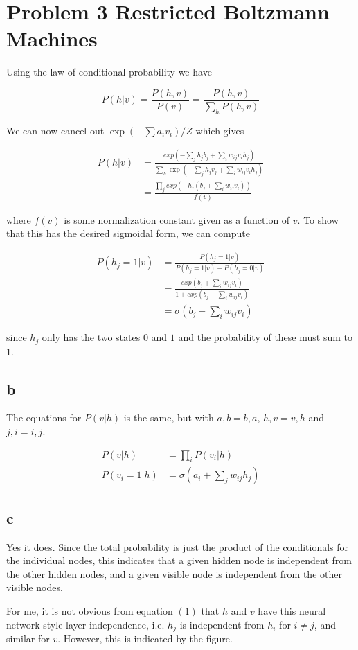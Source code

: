 \documentclass[10pt,a4paper]{article}
\begin{document}
\clearpage

\section*{Problem 3 Restricted Boltzmann Machines}

Using the law of conditional probability we have

\begin{equation}
P(h|v) = \frac{P(h,v)}{P(v)} = \frac{P(h,v)}{\sum_h P(h,v)}
\end{equation}

We can now cancel out $\exp(-\sum a_i v_i) / Z$ which gives

\begin{align}
P(h|v) &= \frac{exp(-\sum_j h_j b_j + \sum_i w_{ij} v_i h_j)}{\sum_h \exp(-\sum_j h_j v_j + \sum_i w_{ij} v_i h_j)} \\
&= \frac{\prod_j exp(-h_j(b_j + \sum_i w_{ij}v_i))}{f(v)}
\end{align}

where $f(v)$ is some normalization constant given as a function of $v$. To show that this has the desired sigmoidal form, we can compute

\begin{align}
P(h_j = 1 | v) &= \frac{P(h_j = 1 | v)}{P(h_j = 1 | v) + P(h_j = 0 | v)} \\
&= \frac{exp(b_j + \sum_i w_{ij}v_i)}{1 + exp(b_j + \sum_i w_{ij}v_i)} \\
&= \sigma (b_j + \sum_i w_{ij}v_i)
\end{align}

since $h_j$ only has the two states $0$ and $1$ and the probability of these must sum to $1$.

\subsection*{b}

The equations for $P(v|h)$ is the same, but with $a,b = b,a$, $h,v = v,h$ and $j,i = i,j$.

\begin{align}
P(v|h) &= \prod_i P(v_i | h) \\
P(v_i = 1| h) & = \sigma(a_i + \sum_j w_{ij} h_j)
\end{align}

\subsection*{c}

Yes it does. Since the total probability is just the product of the conditionals for the individual nodes, this indicates that a given hidden node is independent from the other hidden nodes, and a given visible node is independent from the other visible nodes. 

For me, it is not obvious from equation $(1)$ that $h$ and $v$ have this neural network style layer independence, i.e. $h_j$ is independent from $h_i$ for $i \ne j$, and similar for $v$. However, this is indicated by the figure.
\end{document}
